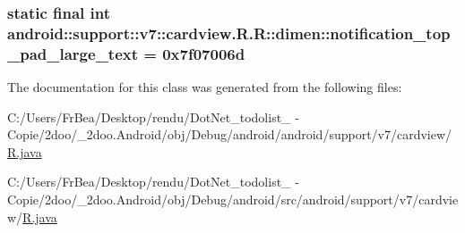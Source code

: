 \hypertarget{classandroid_1_1support_1_1v7_1_1cardview_1_1_r_1_1dimen_e923bad40944e44ed72a01ec0d7be49c}{
\subsubsection[{notification\_\-top\_\-pad\_\-large\_\-text}]{\setlength{\rightskip}{0pt plus 5cm}static final int android::support::v7::cardview.R.R::dimen::notification\_\-top\_\-pad\_\-large\_\-text = 0x7f07006d}}
\label{classandroid_1_1support_1_1v7_1_1cardview_1_1_r_1_1dimen_e923bad40944e44ed72a01ec0d7be49c}




The documentation for this class was generated from the following files:\begin{CompactItemize}
\item 
C:/Users/FrBea/Desktop/rendu/DotNet\_\-todolist\_ - Copie/2doo/\_\-2doo.Android/obj/Debug/android/android/support/v7/cardview/\hyperlink{android_2support_2v7_2cardview_2_r_8java}{R.java}\item 
C:/Users/FrBea/Desktop/rendu/DotNet\_\-todolist\_ - Copie/2doo/\_\-2doo.Android/obj/Debug/android/src/android/support/v7/cardview/\hyperlink{src_2android_2support_2v7_2cardview_2_r_8java}{R.java}\end{CompactItemize}
